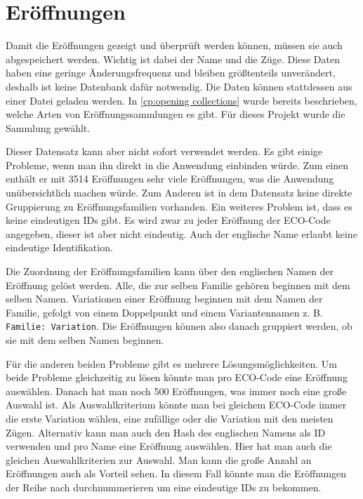 \section{Eröffnungen}
Damit die Eröffnungen gezeigt und überprüft werden können, müssen sie auch abgespeichert werden. Wichtig ist dabei der Name und die Züge. Diese Daten haben eine geringe Änderungsfrequenz und bleiben größtenteils unverändert, deshalb ist keine Datenbank dafür notwendig. Die Daten können stattdessen aus einer Datei geladen werden. In \autoref{cp:opening collections} wurde bereits beschrieben, welche Arten von Eröffnungssammlungen es gibt. Für dieses Projekt wurde die Sammlung \cite{lichessorg_chess-openings_2025} gewählt.

Dieser Datensatz kann aber nicht sofort verwendet werden. Es gibt einige Probleme, wenn man ihn direkt in die Anwendung einbinden würde. Zum einen enthält er mit 3514 Eröffnungen sehr viele Eröffnungen, was die Anwendung unübersichtlich machen würde. Zum Anderen ist in dem Datensatz keine direkte Gruppierung zu Eröffnungsfamilien vorhanden. Ein weiteres Problem ist, dass es keine eindeutigen IDs gibt. Es wird zwar zu jeder Eröffnung der ECO-Code angegeben, dieser ist aber nicht eindeutig. Auch der englische Name erlaubt keine eindeutige Identifikation.

Die Zuordnung der Eröffnungsfamilien kann über den englischen Namen der Eröffnung gelöst werden. Alle, die zur selben Familie gehören beginnen mit dem selben Namen. Variationen einer Eröffnung beginnen mit dem Namen der Familie, gefolgt von einem Doppelpunkt und einem Variantennamen z. B. \lstinline{Familie: Variation}. Die Eröffnungen können also danach gruppiert werden, ob sie mit dem selben Namen beginnen.

Für die anderen beiden Probleme gibt es mehrere Lösungsmöglichkeiten. Um beide Probleme gleichzeitig zu lösen könnte man pro ECO-Code eine Eröffnung auswählen. Danach hat man noch 500 Eröffnungen, was immer noch eine große Auswahl ist. Als Auswahlkriterium könnte man bei gleichem ECO-Code immer die erste Variation wählen, eine zufällige oder die Variation mit den meisten Zügen. Alternativ kann man auch den Hash des englischen Namens als ID verwenden und pro Name eine Eröffnung auswählen. Hier hat man auch die gleichen Auswahlkriterien zur Auswahl. Man kann die große Anzahl an Eröffnungen auch als Vorteil sehen. In diesem Fall könnte man die Eröffnungen der Reihe nach durchnummerieren um eine eindeutige IDs zu bekommen.

